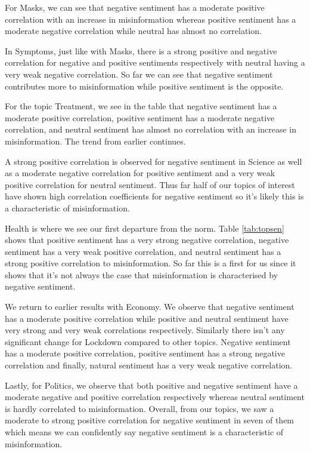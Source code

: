 \documentclass{l4proj}
\begin{document}
For Masks, we can see that negative sentiment has a moderate positive correlation with an increase in misinformation whereas positive sentiment has a moderate negative correlation while neutral has almost no correlation.

In Symptoms, just like with Masks, there is a strong positive and negative correlation for negative and positive sentiments respectively with neutral having a very weak negative correlation. So far we can see that negative sentiment contributes more to misinformation while positive sentiment is the opposite.

For the topic Treatment, we see in the table that negative sentiment has a moderate positive correlation, positive sentiment has a moderate negative correlation, and neutral sentiment has almost no correlation with an increase in misinformation. The trend from earlier continues.

A strong positive correlation is observed for negative sentiment in Science as well as a moderate negative correlation for positive sentiment and a very weak positive correlation for neutral sentiment. Thus far half of our topics of interest have shown high correlation coefficients for negative sentiment so it's likely this is a characteristic of misinformation.

Health is where we see our first departure from the norm. Table \ref{tab:topsen} shows that positive sentiment has a very strong negative correlation, negative sentiment has a very weak positive correlation, and neutral sentiment has a strong positive correlation to misinformation. So far this is a first for us since it shows that it's not always the case that misinformation is characterised by negative sentiment.

We return to earlier results with Economy. We observe that negative sentiment has a moderate positive correlation while positive and neutral sentiment have very strong and very weak correlations respectively. Similarly there isn't any significant change for Lockdown compared to other topics. Negative sentiment has a moderate positive correlation, positive sentiment has a strong negative correlation and finally, natural sentiment has a very weak negative correlation.

Lastly, for Politics, we observe that both positive and negative sentiment have a moderate negative and positive correlation respectively whereas neutral sentiment is hardly correlated to misinformation. Overall, from our topics, we saw a moderate to strong positive correlation for negative sentiment in seven of them which means we can confidently say negative sentiment is a characteristic of misinformation.
\end{document}
